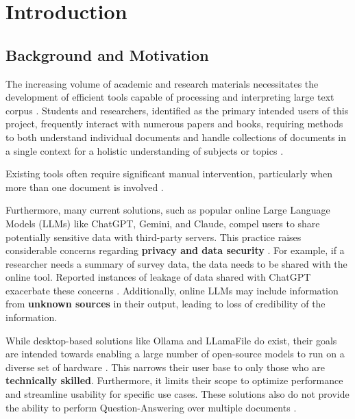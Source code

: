 
\chapter {Introduction}
\label{ch:Introduction}

\section{Background and Motivation}
\label{sec:Background and Motivation}
The increasing volume of academic and research materials necessitates the development of efficient tools capable of processing and interpreting large text corpus \cite{vaswani2017attention, devlin2018bert}. Students and researchers, identified as the primary intended users of this project, frequently interact with numerous papers and books, requiring methods to both understand individual documents and handle collections of documents in a single context for a holistic understanding of subjects or topics \cite{liu2019text}.

Existing tools often require significant manual intervention, particularly when more than one document is involved \cite{beltagy2020longformer}.

Furthermore, many current solutions, such as popular online Large Language Models (LLMs) like ChatGPT, Gemini, and Claude, compel users to share potentially sensitive data with third-party servers. This practice raises considerable concerns regarding \textbf{privacy and data security} \cite{bommasani2021opportunities, wolf2019huggingface}. For example, if a researcher needs a summary of survey data, the data needs to be shared with the online tool. Reported instances of leakage of data shared with ChatGPT exacerbate these concerns \cite{openai2023gpt4}. Additionally, online LLMs may include information from \textbf{unknown sources} in their output, leading to loss of credibility of the information.

While desktop-based solutions like Ollama and LLamaFile do exist, their goals are intended towards enabling a large number of open-source models to run on a diverse set of hardware \cite{touvron2023llama}. This narrows their user base to only those who are \textbf{technically skilled}. Furthermore, it limits their scope to optimize performance and streamline usability for specific use cases. These solutions also do not provide the ability to perform Question-Answering over multiple documents \cite{izacard2021leveraging}.

